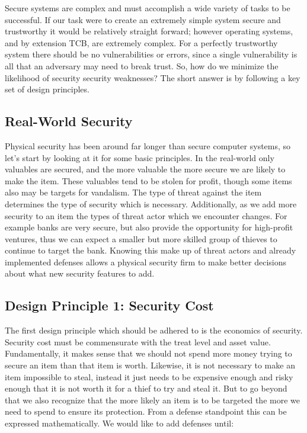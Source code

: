   Secure systems are complex and must accomplish a wide variety of tasks to be successful.
  If our task were to create an extremely simple system secure and trustworthy it would be relatively 
    straight forward; however operating systems, and by extension TCB, are extremely complex.
  For a perfectly trustworthy system there should be no vulnerabilities or errors, since a single
    vulnerability is all that an adversary may need to break trust.
  So, how do we minimize the likelihood of security security weaknesses?
  The short answer is by following a key set of design principles.

  \subsection{Real-World Security}
  \label{ssec:real_world_security}

    Physical security has been around far longer than secure computer systems, so let's start by
      looking at it for some basic principles.
    In the real-world only valuables are secured, and the more valuable the more secure we are likely
      to make the item.
    These valuables tend to be stolen for profit, though some items also may be targets for vandalism.
    The type of threat against the item determines the type of security which is necessary.
    Additionally, as we add more security to an item the types of threat actor which we encounter changes.
    For example banks are very secure, but also provide the opportunity for high-profit ventures,
      thus we can expect a smaller but more skilled group of thieves to continue to target the bank.
    Knowing this make up of threat actors and already implemented defenses allows a physical security
      firm to make better decisions about what new security features to add.

  \subsection{Design Principle 1: Security Cost}
  \label{ssec:design_principle_1_security_cost}

    The first design principle which should be adhered to is the economics of security.
    Security cost must be commensurate with the treat level and asset value.
    Fundamentally, it makes sense that we should not spend more money trying to secure an item than
      that item is worth.
    Likewise, it is not necessary to make an item impossible to steal, instead it just needs to be 
      expensive enough and risky enough that it is not worth it for a thief to try and steal it.
    But to go beyond that we also recognize that the more likely an item is to be targeted the more we need
      to spend to ensure its protection.
    From a defense standpoint this can be expressed mathematically.
    We would like to add defenses until:

